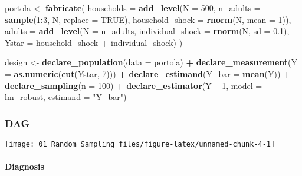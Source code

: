 \documentclass[
]{article}
\newenvironment{Shaded}{\begin{snugshade}}{\end{snugshade}}
\newcommand{\DataTypeTok}[1]{\textcolor[rgb]{0.13,0.29,0.53}{#1}}
\newcommand{\DecValTok}[1]{\textcolor[rgb]{0.00,0.00,0.81}{#1}}
\newcommand{\FloatTok}[1]{\textcolor[rgb]{0.00,0.00,0.81}{#1}}
\newcommand{\KeywordTok}[1]{\textcolor[rgb]{0.13,0.29,0.53}{\textbf{#1}}}
\newcommand{\NormalTok}[1]{#1}
\newcommand{\OperatorTok}[1]{\textcolor[rgb]{0.81,0.36,0.00}{\textbf{#1}}}
\newcommand{\OtherTok}[1]{\textcolor[rgb]{0.56,0.35,0.01}{#1}}
\newcommand{\StringTok}[1]{\textcolor[rgb]{0.31,0.60,0.02}{#1}}
\begin{document}
\begin{Shaded}
\begin{Highlighting}[]
\NormalTok{portola <-}
\StringTok{  }\KeywordTok{fabricate}\NormalTok{(}
    \DataTypeTok{households =} \KeywordTok{add_level}\NormalTok{(}\DataTypeTok{N =} \DecValTok{500}\NormalTok{, }
                           \DataTypeTok{n_adults =} \KeywordTok{sample}\NormalTok{(}\DecValTok{1}\OperatorTok{:}\DecValTok{3}\NormalTok{, N, }\DataTypeTok{replace =} \OtherTok{TRUE}\NormalTok{),}
                           \DataTypeTok{household_shock =} \KeywordTok{rnorm}\NormalTok{(N, }\DataTypeTok{mean =} \DecValTok{1}\NormalTok{)),}
    \DataTypeTok{adults =} \KeywordTok{add_level}\NormalTok{(}\DataTypeTok{N =}\NormalTok{ n_adults, }
                       \DataTypeTok{individual_shock =} \KeywordTok{rnorm}\NormalTok{(N, }\DataTypeTok{sd =} \FloatTok{0.1}\NormalTok{),}
                       \DataTypeTok{Ystar =}\NormalTok{ household_shock }\OperatorTok{+}\StringTok{ }\NormalTok{individual_shock)}
\NormalTok{    )}

\NormalTok{design <-}\StringTok{ }
\StringTok{  }\KeywordTok{declare_population}\NormalTok{(}\DataTypeTok{data =}\NormalTok{ portola) }\OperatorTok{+}\StringTok{ }
\StringTok{  }\KeywordTok{declare_measurement}\NormalTok{(}\DataTypeTok{Y =} \KeywordTok{as.numeric}\NormalTok{(}\KeywordTok{cut}\NormalTok{(Ystar, }\DecValTok{7}\NormalTok{))) }\OperatorTok{+}\StringTok{ }
\StringTok{  }\KeywordTok{declare_estimand}\NormalTok{(}\DataTypeTok{Y_bar =} \KeywordTok{mean}\NormalTok{(Y)) }\OperatorTok{+}\StringTok{ }
\StringTok{  }\KeywordTok{declare_sampling}\NormalTok{(}\DataTypeTok{n =} \DecValTok{100}\NormalTok{) }\OperatorTok{+}\StringTok{ }
\StringTok{  }\KeywordTok{declare_estimator}\NormalTok{(Y }\OperatorTok{~}\StringTok{ }\DecValTok{1}\NormalTok{, }\DataTypeTok{model =}\NormalTok{ lm_robust, }\DataTypeTok{estimand =} \StringTok{"Y_bar"}\NormalTok{)}
\end{Highlighting}
\end{Shaded}

\hypertarget{dag}{%
\subsubsection{DAG}\label{dag}}

\texttt{[image: 01\_Random\_Sampling\_files/figure-latex/unnamed-chunk-4-1]}

\hypertarget{diagnosis}{%
\paragraph{Diagnosis}\label{diagnosis}}
\end{document}
